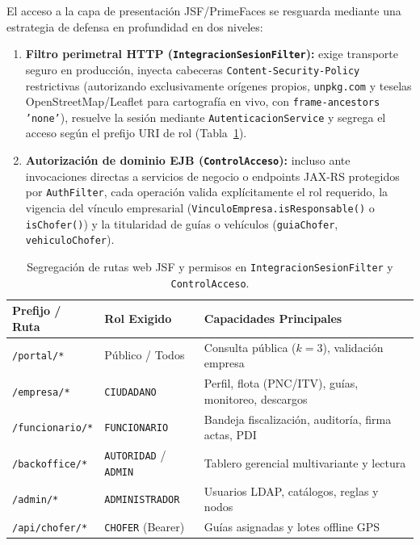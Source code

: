 \documentclass[11pt,a4paper,twocolumn]{article}
\begin{document}
El acceso a la capa de presentación JSF/PrimeFaces se resguarda mediante una estrategia de defensa en profundidad en dos niveles:
\begin{enumerate}
    \item \textbf{Filtro perimetral HTTP (\texttt{IntegracionSesionFilter}):} exige transporte seguro en producción, inyecta cabeceras \texttt{Content-Security-Policy} restrictivas (autorizando exclusivamente orígenes propios, \texttt{unpkg.com} y teselas OpenStreetMap/Leaflet para cartografía en vivo, con \texttt{frame-ancestors 'none'}), resuelve la sesión mediante \texttt{AutenticacionService} y segrega el acceso según el prefijo URI de rol (Tabla~\ref{tab:roles}).
    \item \textbf{Autorización de dominio EJB (\texttt{ControlAcceso}):} incluso ante invocaciones directas a servicios de negocio o endpoints JAX-RS protegidos por \texttt{AuthFilter}, cada operación valida explícitamente el rol requerido, la vigencia del vínculo empresarial (\texttt{VinculoEmpresa.isResponsable()} o \texttt{isChofer()}) y la titularidad de guías o vehículos (\texttt{guiaChofer}, \texttt{vehiculoChofer}).
\end{enumerate}

\begin{table}[t]
\centering
\caption{Segregación de rutas web JSF y permisos en \texttt{IntegracionSesionFilter} y \texttt{ControlAcceso}.}
\label{tab:roles}
\scriptsize
\begin{tabularx}{\columnwidth}{@{}ll>{\raggedright\arraybackslash}X@{}}
\toprule
\textbf{Prefijo / Ruta} & \textbf{Rol Exigido} & \textbf{Capacidades Principales} \\
\midrule
\texttt{/portal/*} & Público / Todos & Consulta pública ($k=3$), validación empresa \\
\texttt{/empresa/*} & \texttt{CIUDADANO} & Perfil, flota (PNC/ITV), guías, monitoreo, descargos \\
\texttt{/funcionario/*} & \texttt{FUNCIONARIO} & Bandeja fiscalización, auditoría, firma actas, PDI \\
\texttt{/backoffice/*} & \texttt{AUTORIDAD} / \texttt{ADMIN} & Tablero gerencial multivariante y lectura \\
\texttt{/admin/*} & \texttt{ADMINISTRADOR} & Usuarios LDAP, catálogos, reglas y nodos \\
\texttt{/api/chofer/*} & \texttt{CHOFER} (Bearer) & Guías asignadas y lotes offline GPS \\
\bottomrule
\end{tabularx}
\end{table}
\end{document}
